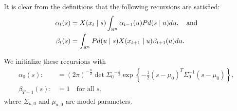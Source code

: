 \documentclass[12pt,leqno]{article}
\begin{document}
It is clear from the definitions that the following recursions are satisfied:
\begin{align}
\alpha_t(s) &= X(x_t \mid s)\int_{{\mathbb R}^n}\alpha_{t-1}(u)Pd(s \mid u)du,\quad\text{and}\label{alpha:0}\\
\beta_t(s) &= \int_{{\mathbb R}^{n}}Pd(u \mid s)X(x_{t+1} \mid u)\beta_{t+1}(u)du.\label{beta:0}
\end{align}

We initialize these recursions with
\begin{align*}
\alpha_0(s) :&= (2\pi)^{-\frac{n}{2}}\det{\Sigma_0}^{-\frac{1}{2}}\exp\left\{-\frac{1}{2}(s-\mu_0)^T\Sigma_0^{-1}(s-\mu_0)\right\},\\
\beta_{T+1}(s) :&= 1 \quad\text{for all $s$},
\end{align*}
where $\Sigma_{a,0}$ and $\mu_{a,0}$ are model parameters.
\end{document}
